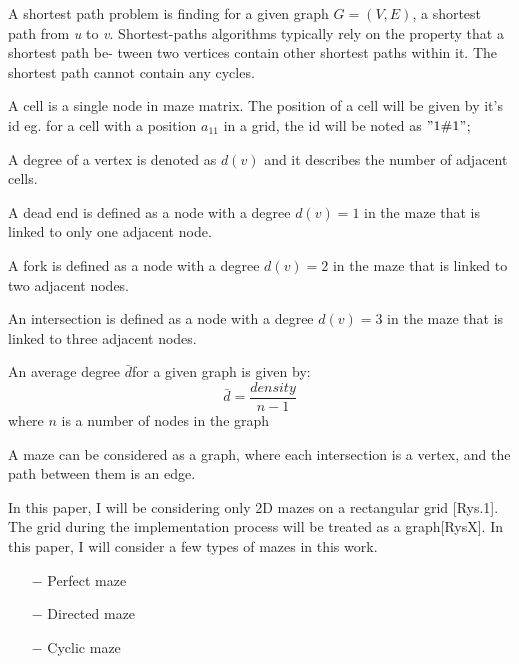 \begin{definition}
A shortest path problem is finding for a given graph $G = (V,E)$, a shortest path from \textit{u} to \textit{v}. Shortest-paths algorithms typically rely on the property that a shortest path be- tween two vertices contain other shortest paths within it.
The shortest path cannot contain any cycles.\cite{introduction }
\end{definition}
\begin{definition}
A cell is a single node in maze matrix. The position of a cell will be given by it's id eg. for a cell with a position $a_{11}$ in a grid, the id will be noted as $"1\char"0023 1"$;	
\end{definition}
\begin{definition}
A degree of a vertex is denoted as $d(v)$ and it describes the number of adjacent cells.
\end{definition}
\begin{definition}
A dead end is defined as a node with a degree $d(v) = 1$ in the maze that is linked to only one adjacent node.
\end{definition}
\begin{definition}
A fork is defined as a node with a degree $d(v) = 2$ in the maze that is linked to two adjacent nodes.
\end{definition}
\begin{definition}
An intersection is defined as a node with a degree $d(v) = 3$ in the maze that is linked to three adjacent nodes.
\end{definition}
\begin{definition}
An average degree $\bar{d}$for a given graph is given by:
\begin{equation}
\bar{d} = \frac{density}{n-1}	
\end{equation}	
where $n$ is a number of nodes in the graph
\end{definition}
\begin{definition}
A maze can be considered as a graph, where each intersection is a vertex, and the path between them is an edge. 
\end{definition}
In this paper, I will be considering only 2D mazes on a rectangular grid [Rys.1]. The grid during the implementation process will be treated as a graph[RysX]. In this paper, I will consider a few types of mazes in this work.
 \begin{itemize}
 \item[$-$] Perfect maze
 \item[$-$] Directed maze
 \item[$-$] Cyclic maze
 \end{itemize}
